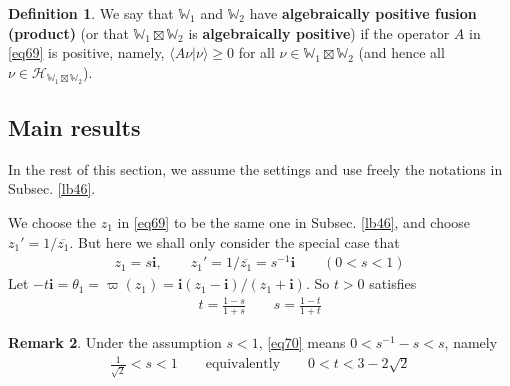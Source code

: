 \documentclass[11pt,b5paper,notitlepage]{article}
\theoremstyle{definition}
\newtheorem{df}{Definition}[section]
\newtheorem{rem}[df]{Remark}
\theoremstyle{plain}
\newcommand{\mc}{\mathcal}
\newcommand{\ovl}{\overline}
\newcommand{\bk}[1]{\langle {#1}\rangle}
\newcommand{\im}{\mathbf{i}}
\newcommand{\Wbb}{\mathbb W}
\numberwithin{equation}{section}
\begin{document}
\begin{df}\label{lb84}
We say that $\Wbb_1$ and $\Wbb_2$ have \textbf{algebraically positive fusion (product)} (or that $\Wbb_1\boxtimes\Wbb_2$ is \textbf{algebraically positive}) if the operator $A$ in \eqref{eq69} is positive, namely, $\bk{A\nu|\nu}\geq0$ for all $\nu\in\Wbb_1\boxtimes\Wbb_2$ (and hence all $\nu\in\mc H_{\Wbb_1\boxtimes\Wbb_2}$).
\end{df}





\subsection{Main results}\label{lb71}

In the rest of this section, we assume the settings and use freely the notations in Subsec. \ref{lb46}. 

We choose the $z_1$  in \eqref{eq69} to be the same one in Subsec. \ref{lb46}, and choose $z_1'=1/\ovl{z_1}$. But here we shall only consider the special case that
\begin{align*}
z_1=s\im,\qquad z_1'=1/\ovl{z_1}=s^{-1}\im\qquad(0<s<1)
\end{align*}
Let $-t\im=\theta_1=\varpi(z_1)=\im(z_1-\im)/(z_1+\im)$. So $t>0$ satisfies
\begin{align*}
t=\frac{1-s}{1+s}\qquad s=\frac{1-t}{1+t}
\end{align*}

\begin{rem}\label{lb58}
Under the assumption $s<1$, \eqref{eq70} means $0<s^{-1}-s<s$, namely
\begin{align}
\frac{1}{\sqrt 2}<s<1\qquad\text{equivalently}\qquad 0<t<3-2\sqrt 2  \label{eq73}
\end{align}
\end{rem}
\end{document}
